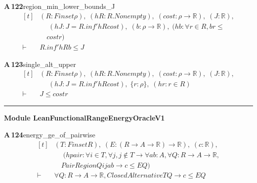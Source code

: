 \documentclass[conference]{IEEEtran}
\theoremstyle{definition}
\newcommand{\lean}[1]{\textsf{\footnotesize #1}}
\begin{document}
\noindent\textbf{A\,122}\quad\lean{region\_min\_lower\_bounds\_J}
{\footnotesize\[ \begin{aligned}[t]
&(\mathit{R} : \mathit{Finset} \rho ),\; (\mathit{hR} : \mathit{R}.\mathit{Nonempty}),\; (\mathit{cost} : \rho \to \mathbb{R} ),\; (\mathit{J} : \mathbb{R} ),\\
&\quad \; (\mathit{hJ} : \mathit{J} = \mathit{R}.\mathit{inf'} \mathit{hR} \mathit{cost}),\; (\mathit{b} : \rho \to \mathbb{R} ),\; (\mathit{hb} : \forall \mathit{r} \in \mathit{R}, \mathit{b} \mathit{r} \leq\\
&\quad \mathit{cost} \mathit{r})\\
\vdash\;&\mathit{R}.\mathit{inf'} \mathit{hR} \mathit{b} \leq \mathit{J}
\end{aligned} \]}

\noindent\textbf{A\,123}\quad\lean{single\_alt\_upper}
{\footnotesize\[ \begin{aligned}[t]
&(\mathit{R} : \mathit{Finset} \rho ),\; (\mathit{hR} : \mathit{R}.\mathit{Nonempty}),\; (\mathit{cost} : \rho \to \mathbb{R} ),\; (\mathit{J} : \mathbb{R} ),\\
&\quad \; (\mathit{hJ} : \mathit{J} = \mathit{R}.\mathit{inf'} \mathit{hR} \mathit{cost}),\; \{ \mathit{r} : \rho \},\; (\mathit{hr} : \mathit{r} \in \mathit{R})\\
\vdash\;&\mathit{J} \leq \mathit{cost} \mathit{r}
\end{aligned} \]}

\vspace{4pt}\noindent\rule{\columnwidth}{0.4pt}\par\vspace{2pt}
\noindent\textbf{Module \lean{LeanFunctionalRangeEnergyOracleV1}}\par\vspace{3pt}

\noindent\textbf{A\,124}\quad\lean{energy\_ge\_of\_pairwise}
{\footnotesize\[ \begin{aligned}[t]
&(\mathit{T} : \mathit{Finset} \mathit{R}),\; (\mathit{E} : (\mathit{R} \to \mathit{A} \to \mathbb{R} ) \to \mathbb{R} ),\; (\mathit{c} : \mathbb{R} ),\\
&\quad \; (\mathit{hpair} : \forall \mathit{i} \in \mathit{T}, \forall \mathit{j}, \mathit{j} \notin \mathit{T} \to \forall \mathit{a} \mathit{b} : \mathit{A}, \forall \mathit{Q} : \mathit{R} \to \mathit{A} \to \mathbb{R} ,\\
&\quad \mathit{PairRegion} \mathit{Q} \mathit{i} \mathit{j} \mathit{a} \mathit{b} \to \mathit{c} \leq \mathit{E} \mathit{Q})\\
\vdash\;&\forall \mathit{Q} : \mathit{R} \to \mathit{A} \to \mathbb{R} , \mathit{ClosedAlternative} \mathit{T} \mathit{Q} \to \mathit{c} \leq \mathit{E} \mathit{Q}
\end{aligned} \]}
\end{document}
